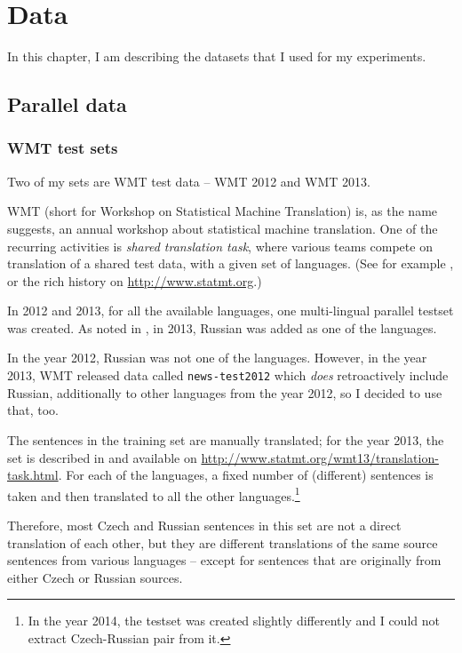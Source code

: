 \chapter{Data}
\label{chapter:data}
In this chapter, I am describing the datasets that I used for my experiments.


\section{Parallel data}
\label{corpora:parallel}

\subsection{WMT test sets}
Two of my sets are WMT test data -- WMT 2012 and WMT 2013.

WMT (short for Workshop on Statistical Machine Translation) is, as the name suggests, an annual workshop about statistical machine translation. One of the recurring activities is \emph{shared translation task}, where various teams compete on translation of a shared test data, with a given set of languages. (See for example \cite{wmt_findings_2013}, or the rich history on \url{http://www.statmt.org}.) 


In 2012 and 2013, for all the available languages, one multi-lingual parallel testset was created.
As noted in \cite{wmt_findings_2013}, in 2013, Russian was added as one of the languages. 

In the year 2012, Russian was not one of the languages. However, in the year 2013, WMT released data called \texttt{news-test2012} which \emph{does} retroactively include Russian, additionally to other languages from the year 2012, so I decided to use that, too.

The sentences in the training set are manually translated; for the year 2013, the set is described in \cite{wmt_findings_2013} and available on \url{http://www.statmt.org/wmt13/translation-task.html}. For each of the languages, a fixed number of (different) sentences is taken and then translated to all the other languages.\footnote{In the year 2014, the testset was created slightly differently and I could not extract Czech-Russian pair from it.}


Therefore, most Czech and Russian sentences in this set are not a direct translation of each other, but they are different translations of the same source sentences from various languages -- except for sentences that are originally from either Czech or Russian sources. 

